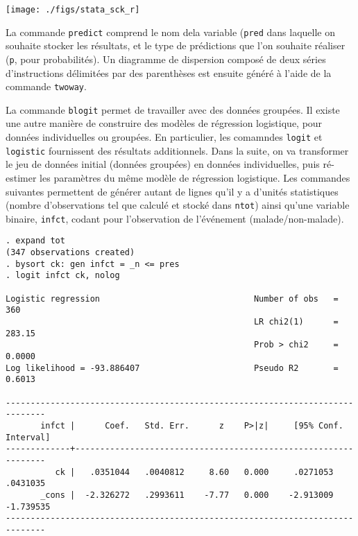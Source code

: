 \texttt{[image: ./figs/stata\_sck\_r]}

La commande \texttt{predict} comprend le nom dela variable (\texttt{pred}
dans laquelle on souhaite stocker les résultats, et le type de prédictions
que l'on souhaite réaliser (\texttt{p}, pour probabilités). Un diagramme de
dispersion composé de deux séries d'instructions délimitées par des
parenthèses est ensuite généré à l'aide de la commande \texttt{twoway}.

La commande \texttt{blogit} permet de travailler avec des données
groupées. Il existe une autre manière de construire des modèles de
régression logistique, pour données individuelles ou groupées. En
particulier, les comamndes \texttt{logit} et \texttt{logistic} fournissent
des résultats additionnels. Dans la suite, on va transformer le jeu de
données initial (données groupées) en données individuelles, puis ré-estimer
les paramètres du même modèle de régression logistique. Les commandes
suivantes permettent de générer autant de lignes qu'il y a d'unités
statistiques (nombre d'observations tel que calculé et stocké dans
\texttt{ntot}) ainsi qu'une variable binaire, \texttt{infct}, codant pour
l'observation de l'événement (malade/non-malade).
\begin{verbatim}
. expand tot
(347 observations created)
. bysort ck: gen infct = _n <= pres
. logit infct ck, nolog

Logistic regression                               Number of obs   =        360
                                                  LR chi2(1)      =     283.15
                                                  Prob > chi2     =     0.0000
Log likelihood = -93.886407                       Pseudo R2       =     0.6013

------------------------------------------------------------------------------
       infct |      Coef.   Std. Err.      z    P>|z|     [95% Conf. Interval]
-------------+----------------------------------------------------------------
          ck |   .0351044   .0040812     8.60   0.000     .0271053    .0431035
       _cons |  -2.326272   .2993611    -7.77   0.000    -2.913009   -1.739535
------------------------------------------------------------------------------
\end{verbatim}

